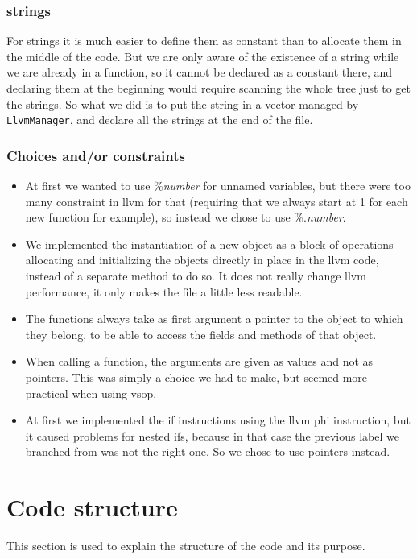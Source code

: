 \documentclass[a4paper,11pt]{article}
\begin{document}
	\subsubsection{strings}
	For strings it is much easier to define them as constant than to allocate them in the middle of the code. But we are only aware of the existence of a string while we are already in a function, so it cannot be declared as a constant there, and declaring them at the beginning would require scanning the whole tree just to get the strings. So what we did is to put the string in a vector managed by \texttt{LlvmManager}, and declare all the strings at the end of the file.

  \subsubsection{Choices and/or constraints}
    \begin{itemize}
		\item At first we wanted to use \%\textit{number} for unnamed variables, but there were too many constraint in llvm for that (requiring that we always start at 1 for each new function for example), so instead we chose to use \%.\textit{number}.
    \item We implemented the instantiation of a new object as a block of operations allocating and initializing the objects directly in place in the llvm code, instead of a separate method to do so. It does not really change llvm performance, it only makes the file a little less readable.
    \item The functions always take as first argument a pointer to the object to which they belong, to be able to access the fields and methods of that object.
    \item When calling a function, the arguments are given as values and not as pointers. This was simply a choice we had to make, but seemed more practical when using vsop.
	\item At first we implemented the if instructions using the llvm phi instruction, but it caused problems for nested ifs, because in that case the previous label we branched from was not the right one. So we chose to use pointers instead.
    \end{itemize}

  \section{Code structure}
    This section is used to explain the structure of the code and its purpose.
\end{document}

